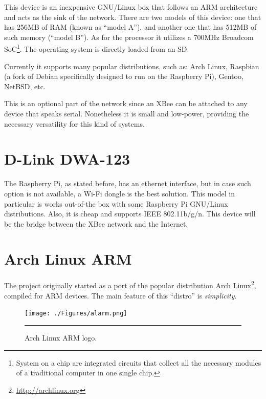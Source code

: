 This device is an inexpensive GNU/Linux box that follows an ARM architecture and acts as the sink of the network. There are two models of this device: one that has 256MB of RAM (known as ``model A''), and another one that has 512MB of such memory (``model B''). As for the processor it utilizes a 700MHz Broadcom SoC\footnote{System on a chip are integrated circuits that collect all the necessary modules of a traditional computer in one single chip.}. The operating system is directly loaded from an SD.

Currently it supports many popular distributions, such as: Arch Linux, Raspbian (a fork of Debian specifically designed to run on the Raspberry Pi), Gentoo, NetBSD, etc.

This is an optional part of the network since an XBee can be attached to any device that speaks serial. Nonetheless it is small and low-power, providing the necessary versatility for this kind of systems.

\section{D-Link DWA-123}

The Raspberry Pi, as stated before, has an ethernet interface, but in case such option is not available, a Wi-Fi dongle is the best solution. This model in particular is works out-of-the box with some Raspberry Pi GNU/Linux distributions. Also, it is cheap and supports IEEE 802.11b/g/n. This device will be the bridge between the XBee network and the Internet.


\section{Arch Linux ARM}
\label{sec:alarmmm}

The project originally started as a port of the popular distribution Arch Linux\footnote{\url{http://archlinux.org}}, compiled for ARM devices. The main feature of this ``distro'' is \emph{simplicity}.

\begin{figure}[htbp]
    \centering
    \texttt{[image: ./Figures/alarm.png]}
        \rule{35em}{0.5pt}
        \caption[Arch Linux ARM Logo]{Arch Linux ARM logo.}
    \label{fig:alarm_logo}
\end{figure}

